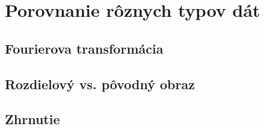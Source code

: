


\section{Porovnanie rôznych typov dát}

\todo 

\subsection{Fourierova transformácia}

\todo 

\subsection{Rozdielový vs. pôvodný obraz}

\todo 

\subsection{Zhrnutie}

\todo 



